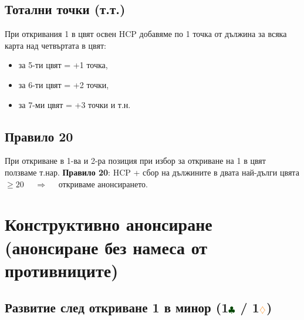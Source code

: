 \documentclass[10pt,a5paper]{extarticle}
\newcommand{\Rdiamond}{\textcolor{orange}{\diamondsuit}}
\newcommand{\Bclub}{\textcolor{darkgreen}{\clubsuit}}
\begin{document}

\subsection*{Тотални точки (т.т.)}
При откривания 1 в цвят освен HCP добавяме по 1 точка от дължина за всяка карта над четвъртата в цвят:
\begin{itemize}
  \item[] за 5-ти цвят = +1 точка,
  \item[] за 6-ти цвят = +2 точки,
  \item[] за 7-ми цвят = +3 точки и т.н.
\end{itemize}

\subsection*{Правило 20}
При откриване в 1-ва и 2-ра позиция при избор за откриване на 1 в цвят ползваме т.нар. \textbf{Правило 20}:  
HCP + сбор на дължините в двата най-дълги цвята $\geq 20$
$\quad \Rightarrow \quad$ откриваме анонсирането.
\section{Конструктивно анонсиране (анонсиране без намеса от противниците)}

\subsection{Развитие след откриване 1 в минор (1$\Bclub$ / 1$\Rdiamond$)}
\end{document}
